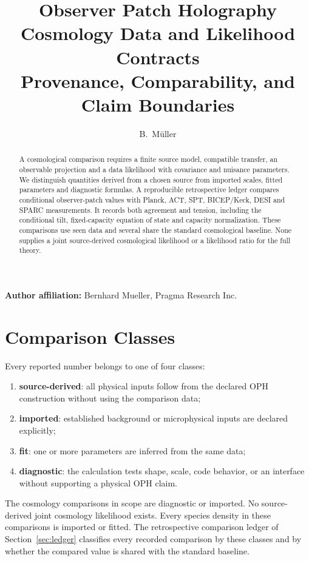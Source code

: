 \documentclass[11pt]{article}
\title{Observer Patch Holography Cosmology Data and Likelihood Contracts\\
\large Provenance, Comparability, and Claim Boundaries}
\author{B.\ M\"uller}
\date{\OPHPaperReleaseDate}
\begin{document}
\maketitle
\OPHPaperReleaseBanner

\begin{center}
\small\textbf{Author affiliation:} Bernhard Mueller, Pragma Research Inc.
\end{center}

\begin{abstract}
A cosmological comparison requires a finite source model, compatible
transfer, an observable projection and a data likelihood with covariance
and nuisance parameters. We distinguish quantities derived from a chosen
source from imported scales, fitted parameters and diagnostic formulas.
A reproducible retrospective ledger compares conditional observer-patch
values with Planck, ACT, SPT, BICEP/Keck, DESI and SPARC measurements.
It records both agreement and tension, including the conditional tilt,
fixed-capacity equation of state and capacity normalization. These
comparisons use seen data and several share the standard cosmological
baseline. None supplies a joint source-derived cosmological likelihood or
a likelihood ratio for the full theory.

\end{abstract}

\section{Comparison Classes}

Every reported number belongs to one of four classes:
\begin{enumerate}[leftmargin=2em]
\item \textbf{source-derived}: all physical inputs follow from the declared OPH
construction without using the comparison data;
\item \textbf{imported}: established background or microphysical inputs are
declared explicitly;
\item \textbf{fit}: one or more parameters are inferred from the same data;
\item \textbf{diagnostic}: the calculation tests shape, scale, code behavior, or
an interface without supporting a physical OPH claim.
\end{enumerate}



The cosmology comparisons in scope are diagnostic or imported. No source-derived
joint cosmology likelihood exists. Every species density in these
comparisons is imported or fitted. The retrospective comparison ledger of
Section~\ref{sec:ledger} classifies every recorded comparison by these
classes and by whether the compared value is shared with the standard
baseline.
\end{document}
